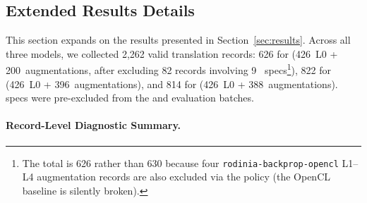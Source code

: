 \subsection{Extended Results Details}
\label{sec:appendix-e4}

This section expands on the results presented in Section~\ref{sec:results}.
Across all three models, we collected 2,262 valid translation records: 626 for \qwenshort{} (426~L0 + 200~augmentations, after excluding 82 records involving 9~\knownfail{} specs\footnote{The \qwenshort{} total is 626 rather than 630 because four \texttt{rodinia-backprop-opencl} L1--L4 augmentation records are also excluded via the \knownfail{} policy (the OpenCL baseline is silently broken).}), 822 for \gptnew{} (426~L0 + 396~augmentations), and 814 for \codex{} (426~L0 + 388~augmentations). \knownfail{} specs were pre-excluded from the \gptnew{} and \codex{} evaluation batches.

\paragraph{Record-Level Diagnostic Summary.}
\begin{table}[h]
\centering
\caption{Record-level diagnostic pass rates across three models and 2,262 valid translation records. Records include L0 samples and L1--L4 augmentation runs for L0-passing pairs, so this table mixes canonical L0 records with model-specific L0-conditional augmentation records. Wilson intervals are descriptive because records are clustered by task; inferential comparison uses the balanced 142 L0 pairs in Section~\ref{sec:passk-analysis}.}
\label{tab:overall-pass}
\small
{}
\end{table}

